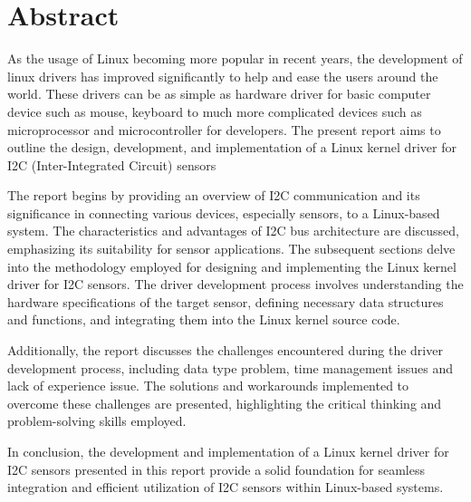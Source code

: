 \documentclass[a4paper]{scrbook}
\begin{document}
\pagestyle{headings}


\chapter*{Abstract}
As the usage of Linux becoming more popular in recent years, the development of linux drivers has improved significantly to
help and ease the users around the world. These drivers can be as simple as hardware driver for basic computer device
such as mouse, keyboard to much more complicated devices such as microprocessor and microcontroller for developers. The present 
report aims to outline the design, development, and implementation of a Linux kernel driver for I2C (Inter-Integrated Circuit) sensors 

The report begins by providing an overview of I2C communication and its significance in connecting various devices, especially 
sensors, to a Linux-based system. The characteristics and advantages of I2C bus architecture are discussed, emphasizing its 
suitability for sensor applications. The subsequent sections delve into the methodology employed for designing and implementing 
the Linux kernel driver for I2C sensors. The driver development process involves understanding the hardware specifications of the target sensor, 
defining necessary data structures and functions, and integrating them into the Linux kernel source code.

Additionally, the report discusses the challenges encountered during the driver development process, including data type problem, time management issues and 
lack of experience issue. The solutions and workarounds implemented to overcome these challenges are presented, 
highlighting the critical thinking and problem-solving skills employed.

In conclusion, the development and implementation of a Linux kernel driver for I2C sensors presented in this report provide a solid foundation 
for seamless integration and efficient utilization of I2C sensors within Linux-based systems.


\tableofcontents

\cleardoublepage%
\setcounter{page}{1}









\end{document}

